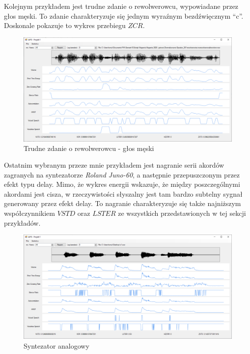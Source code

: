 \documentclass[12pt,a4paper]{article}
\begin{document}
Kolejnym przykładem jest trudne zdanie o rewolwerowcu, wypowiadane przez głos męski. To zdanie
charakteryzuje się jednym wyraźnym bezdźwięcznym ``c''. Doskonale pokazuje to wykres przebiegu
$ZCR$.

\begin{figure}[h!]
\centering
\includegraphics[width=1.0\textwidth]{figures/rewolwerowiec}
\caption{Trudne zdanie o rewolwerowcu - głos męski}
\label{fig:rewolwerowiec}
\end{figure}

Ostatnim wybranym przeze mnie przykładem jest nagranie serii akordów zagranych na syntezatorze
\emph{Roland Juno-60}, a następnie przepuszczonym przez efekt typu delay. Mimo, że wykres energii
wskazuje, że między poszczególnymi akordami jest cisza, w rzeczywistości słyszalny jest tam bardzo
subtelny sygnał generowany przez efekt delay. To nagranie charakteryzuje się także najniższym
współczynnikiem $VSTD$ oraz $LSTER$ ze wszystkich przedstawionych w tej sekcji przykładów.

\begin{figure}[h!]
\centering
\includegraphics[width=1.0\textwidth]{figures/niemowa}
\caption{Syntezator analogowy}
\label{fig:niemowa}
\end{figure}
\end{document}
